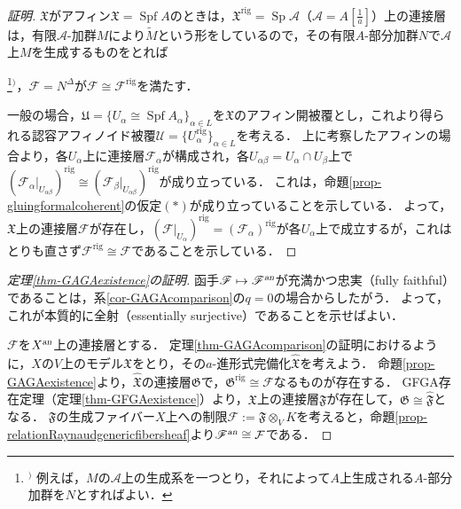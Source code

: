 \documentclass[a4paper,12pt, dvipdfmx]{jsbook}
\def\til#1{\widetilde{#1}}%
\def\rig{\mathop{\mathrm{rig}}\nolimits}
\def\Spf{\mathop{\mathrm{Spf}}\nolimits}
\def\Sp{\mathop{\mathrm{Sp}}\nolimits}
\def\an{\textsl{an}}
\theoremstyle{plain}
\theoremstyle{definition}
\newcounter{chushaku}
\def\chu#1{\addtocounter{chushaku}{1}\footnote[\value{chushaku}]{${}^)$ #1}${}^)$}
\begin{document}
\begin{proof}[証明]
$\mathfrak{X}$がアフィン$\mathfrak{X}=\Spf A$のときは，$\mathfrak{X}^{\rig}=\Sp\mathcal{A}$（$\mathcal{A}=A[\frac{1}{a}]$）上の連接層は，有限$\mathcal{A}$-加群$M$により$\til{M}$という形をしているので，その有限$A$-部分加群$N$で$\mathcal{A}$上$M$を生成するものをとれば\chu{例えば，$M$の$\mathcal{A}$上の生成系を一つとり，それによって$A$上生成される$A$-部分加群を$N$とすればよい．}，$\mathscr{F}=N^{\Delta}$が$\mathcal{F}\cong\mathscr{F}^{\rig}$を満たす．

一般の場合，$\mathfrak{U}=\{U_{\alpha}\cong\Spf A_{\alpha}\}_{\alpha\in L}$を$\mathfrak{X}$のアフィン開被覆とし，これより得られる認容アフィノイド被覆$\mathcal{U}=\{U^{\rig}_{\alpha}\}_{\alpha\in L}$を考える．
上に考察したアフィンの場合より，各$U_{\alpha}$上に連接層$\mathscr{F}_{\alpha}$が構成され，各$U_{\alpha\beta}=U_{\alpha}\cap U_{\beta}$上で$(\mathscr{F}_{\alpha}|_{U_{\alpha\beta}})^{\rig}\cong(\mathscr{F}_{\beta}|_{U_{\alpha\beta}})^{\rig}$が成り立っている．
これは，命題\ref{prop-gluingformalcoherent}の仮定$(\ast)$が成り立っていることを示している．
よって，$\mathfrak{X}$上の連接層$\mathscr{F}$が存在し，$(\mathscr{F}|_{U_{\alpha}})^{\rig}=(\mathscr{F}_{\alpha})^{\rig}$が各$U_{\alpha}$上で成立するが，これはとりも直さず$\mathscr{F}^{\rig}\cong\mathcal{F}$であることを示している．
\end{proof}

\begin{proof}[定理{\rm \ref{thm-GAGAexistence}}の証明]
函手$\mathscr{F}\mapsto\mathscr{F}^{\an}$が充満かつ忠実（fully faithful）であることは，系\ref{cor-GAGAcomparison}の$q=0$の場合からしたがう．
よって，これが本質的に全射（essentially surjective）であることを示せばよい．

$\mathcal{F}$を$X^{\an}$上の連接層とする．
定理{\rm \ref{thm-GAGAcomparison}}の証明におけるように，$X$の$V$上のモデル$\mathfrak{X}$をとり，その$a$-進形式完備化$\widehat{\mathfrak{X}}$を考えよう．
命題\ref{prop-GAGAexistence}より，$\widehat{\mathfrak{X}}$の連接層$\mathfrak{G}$で，$\mathfrak{G}^{\rig}\cong\mathcal{F}$なるものが存在する．
GFGA存在定理（定理\ref{thm-GFGAexistence}）より，$\mathfrak{X}$上の連接層$\mathfrak{F}$が存在して，$\mathfrak{G}\cong\widehat{\mathfrak{F}}$となる．
$\mathfrak{F}$の生成ファイバー$X$上への制限$\mathscr{F}:=\mathfrak{F}\otimes_VK$を考えると，命題\ref{prop-relationRaynaudgenericfibersheaf}より$\mathscr{F}^{\an}\cong\mathcal{F}$である．
\end{proof}
\end{document}
